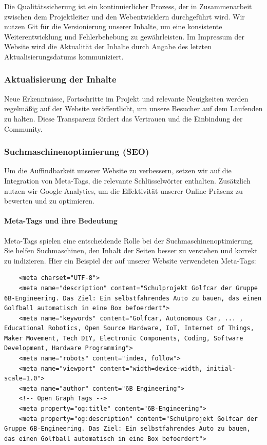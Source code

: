 Die Qualitätssicherung ist ein kontinuierlicher Prozess, der in Zusammenarbeit zwischen dem Projektleiter und den Webentwicklern durchgeführt wird. Wir nutzen Git für die Versionierung unserer Inhalte, um eine konsistente Weiterentwicklung und Fehlerbehebung zu gewährleisten. Im Impressum der Website wird die Aktualität der Inhalte durch Angabe des letzten Aktualisierungsdatums kommuniziert.

\subsubsection{Aktualisierung der Inhalte}

Neue Erkenntnisse, Fortschritte im Projekt und relevante Neuigkeiten werden regelmäßig auf der Website veröffentlicht, um unsere Besucher auf dem Laufenden zu halten. Diese Transparenz fördert das Vertrauen und die Einbindung der Community.

\subsubsection{Suchmaschinenoptimierung (SEO)}

Um die Auffindbarkeit unserer Website zu verbessern, setzen wir auf die Integration von Meta-Tags, die relevante Schlüsselwörter enthalten. Zusätzlich nutzen wir Google Analytics, um die Effektivität unserer Online-Präsenz zu bewerten und zu optimieren.

\paragraph{Meta-Tags und ihre Bedeutung}
Meta-Tags spielen eine entscheidende Rolle bei der Suchmaschinenoptimierung. Sie helfen Suchmaschinen, den Inhalt der Seiten besser zu verstehen und korrekt zu indizieren. Hier ein Beispiel der auf unserer Website verwendeten Meta-Tags:

\begin{lstlisting}
    <meta charset="UTF-8">
    <meta name="description" content="Schulprojekt Golfcar der Gruppe 6B-Engineering. Das Ziel: Ein selbstfahrendes Auto zu bauen, das einen Golfball automatisch in eine Box befoerdert">
    <meta name="keywords" content="Golfcar, Autonomous Car, ... , Educational Robotics, Open Source Hardware, IoT, Internet of Things, Maker Movement, Tech DIY, Electronic Components, Coding, Software Development, Hardware Programming">
    <meta name="robots" content="index, follow">
    <meta name="viewport" content="width=device-width, initial-scale=1.0">
    <meta name="author" content="6B Engineering">
    <!-- Open Graph Tags -->
    <meta property="og:title" content="6B-Engineering">
    <meta property="og:description" content="Schulprojekt Golfcar der Gruppe 6B-Engineering. Das Ziel: Ein selbstfahrendes Auto zu bauen, das einen Golfball automatisch in eine Box befoerdert">
\end{lstlisting}

